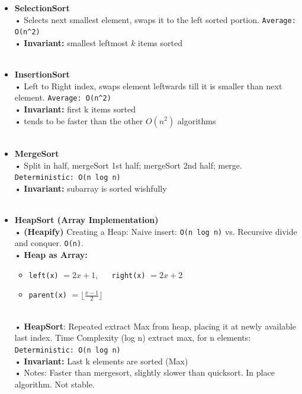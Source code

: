 \documentclass[10pt, landscape]{article}
\newcommand{\floor}[1]{\lfloor #1 \rfloor}
\newcommand{\code}[1]{\colorbox{gray!25!}{\lstinline|#1|}}
\begin{document}
\begin{multicols}{4}
\begin{itemize}
    \item \textbf{SelectionSort} 
    	\\ • Selects next smallest element, swaps it to the left sorted portion. \code{Average: O(n^2)}
    	\\ • \textbf{Invariant:} smallest leftmost $k$ items sorted
    	~\\ ~\\
    	
    \item \textbf{InsertionSort} 
	\\ • Left to Right index, swaps element leftwards till it is smaller than next element. \code{Average: O(n^2)}
    	\\ • \textbf{Invariant:} first k items sorted
    	\\ •  tends to be faster than the other $O(n^2)$ algorithms
    	~\\ ~\\
    	
    \item \textbf{MergeSort} 
	\\ • Split in half, mergeSort 1st half; mergeSort 2nd half; merge.  \code{Deterministic: O(n log n)}
    	\\ • \textbf{Invariant:} subarray is sorted wishfully
    	~\\ ~\\
    	
    \item \textbf{HeapSort (Array Implementation)}
    	\\ • \textbf{(Heapify)} Creating a Heap: Naive insert: \code{O(n log n)} vs. Recursive divide and conquer. \code{O(n)}. 
    	\\ • \textbf{Heap as Array:}
    \begin{itemize}
        \item \code{left(x)} $= 2x + 1$, $\quad$ \code{right(x)} $= 2x + 2$
        \item \code{parent(x)} $= \floor{\frac{x-1}{2}}$
    \end{itemize}
    	~\\ • \textbf{HeapSort}: Repeated extract Max from heap, placing it at newly available last index. Time Complexity (log n) extract max, for n elements:  \code{Deterministic: O(n log n)}
    	\\ • \textbf{Invariant:} Last k elements are sorted (Max)
    	\\ • Notes: Faster than mergesort, slightly slower than quicksort. In place algorithm. Not stable.
    	~\\ ~\\
    	

\end{itemize}
\end{multicols}
\end{document}
